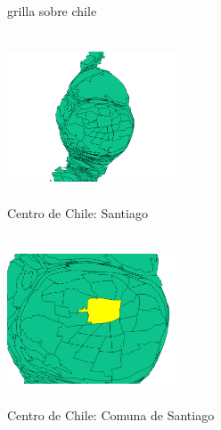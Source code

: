 \documentclass[20pt]{report}
\begin{document}
\begin{itemize}
\begin{figure}[H]
\begin{center}
\vspace{-0.5cm} %
\caption{grilla sobre chile}
\label{Label para referencia}
\end{center}
\end{figure}
\begin{figure}[H]
\begin{center}
\includegraphics[width=5cm, height=5cm]{center.png}
\vspace{-0.5cm} %
\caption{Centro de Chile: Santiago}
\label{Label para referencia}
\end{center}
\end{figure}
\begin{figure}[H]
\begin{center}
\includegraphics[width=5cm, height=5cm]{santiago.png}
\vspace{-0.5cm} %
\caption{Centro de Chile: Comuna de Santiago}
\label{Label para referencia}
\end{center}
\end{figure}


\end{itemize}
\end{document}
